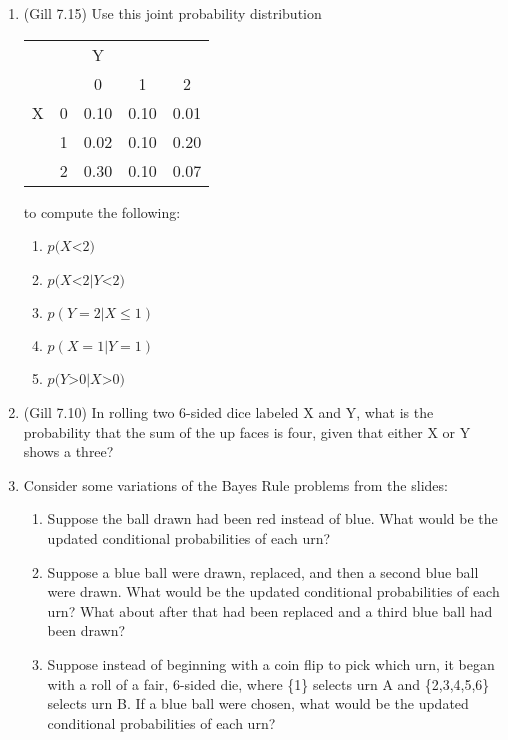 \documentclass[11pt]{article}
\begin{document}
\begin{enumerate}
\item (Gill 7.15) Use this joint probability distribution
\begin{center}
\begin{tabular}{cc|ccc}
    &    & Y     &       &       \\
    &    & 0     & 1     & 2     \\ \hline
X   &0   & 0.10  & 0.10  & 0.01  \\
    &1   & 0.02  & 0.10  & 0.20  \\
    &2   & 0.30  & 0.10  & 0.07
\end{tabular}
\end{center}
to compute the following:
\begin{enumerate}
\item $p(X $<$ 2)$
\item $p(X $<$ 2| Y $<$ 2)$
\item $p(Y = 2| X \leq 1)$
\item $p(X = 1| Y = 1)$
\item $p(Y $>$ 0| X $>$ 0)$
\end{enumerate}


\item (Gill 7.10) In rolling two 6-sided dice labeled X and Y, what is the probability that the sum of the up faces is four, given that either X or Y shows a three?


\item Consider some variations of the Bayes Rule problems from the slides:
\begin{enumerate}
\item Suppose the ball drawn had been red instead of blue.  What would be the updated conditional probabilities of each urn?
\item Suppose a blue ball were drawn, replaced, and then a second blue ball were drawn.  What would be the updated conditional probabilities of each urn?  What about after that had been replaced and a third blue ball had been drawn?
\item Suppose instead of beginning with a coin flip to pick which urn, it began with a roll of a fair, 6-sided die, where \{1\} selects urn A and \{2,3,4,5,6\} selects urn B.  If a blue ball were chosen, what would be the updated conditional probabilities of each urn?
\end{enumerate}



\end{enumerate}
\end{document}
